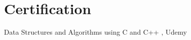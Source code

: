 
\section{{\textcolor{mainHeading}{Certification}}}
 \begin{itemize}[leftmargin=0.15in, label={}] %
    \small{
    \item{ Data Structures and Algorithms using C and C++ , Udemy}
    }
 \end{itemize}